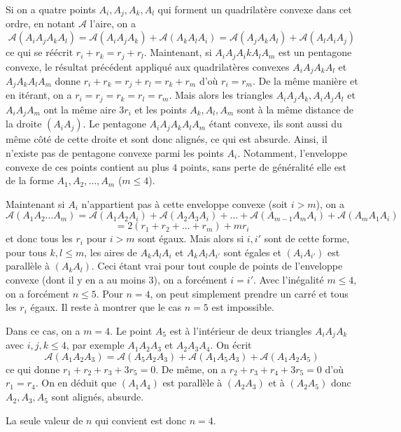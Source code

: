 \begin{sol}
Si on a quatre points $A_i,A_j,A_k,A_l$ qui forment un quadrilatère convexe dans cet ordre, en notant $\mathcal{A}$ l'aire, on a
$$\mathcal{A}(A_iA_jA_kA_l) = \mathcal{A}(A_iA_jA_k) + \mathcal{A}(A_kA_lA_i) = \mathcal{A}(A_jA_kA_l)+\mathcal{A}(A_lA_iA_j)$$
ce qui se réécrit $r_i+r_k = r_j+r_l$. Maintenant, si $A_iA_jA_ikA_lA_m$ est un pentagone convexe, le résultat précédent appliqué aux quadrilatères convexes $A_iA_jA_kA_l$ et $A_jA_kA_lA_m$ donne $r_i+r_k=r_j+r_l=r_k+r_m$ d'où $r_i=r_m$. De la même manière et en itérant, on a $r_i=r_j=r_k=r_l=r_m$. Mais alors les triangles $A_iA_jA_k,A_iA_jA_l$ et $A_iA_jA_m$ ont la même aire $3r_i$ et les points $A_k,A_l,A_m$ sont à la même distance de la droite $(A_iA_j)$. Le pentagone $A_iA_jA_kA_lA_m$ étant convexe, ils sont aussi du même côté de cette droite et sont donc alignés, ce qui est absurde. Ainsi, il n'existe pas de pentagone convexe parmi les points $A_i$. Notamment, l'enveloppe convexe de ces points contient au plus $4$ points, sans perte de généralité elle est de la forme $A_1,A_2,\ldots,A_m$ ($m\le 4$).

Maintenant si $A_i$ n'appartient pas à cette enveloppe convexe (soit $i>m$), on a
$$\mathcal{A}(A_1A_2\ldots A_m)= \mathcal{A}(A_1A_2A_i)+\mathcal{A}(A_2A_3A_i)+\ldots + \mathcal{A}(A_{m-1}A_mA_i)+\mathcal{A}(A_mA_1A_i)$$
$$=2(r_1+r_2+\ldots+r_m)+mr_i$$
et donc tous les $r_i$ pour $i>m$ sont égaux. Mais alors si $i,i'$ sont de cette forme, pour tous $k,l\le m$, les aires de $A_kA_lA_i$ et $A_kA_lA_{i'}$ sont égales et $(A_iA_{i'})$ est parallèle à $(A_kA_l)$. Ceci étant vrai pour tout couple de points de l'enveloppe convexe (dont il y en a au moins $3$), on a forcément $i=i'$. Avec l'inégalité $m\le 4$, on a forcément $n\le 5$. Pour $n=4$, on peut simplement prendre un carré et tous les $r_i$ égaux. Il reste à montrer que le cas $n=5$ est impossible.

Dans ce cas, on a $m=4$. Le point $A_5$ est à l'intérieur de deux triangles $A_iA_jA_k$ avec $i,j,k\le 4$, par exemple $A_1A_2A_3$ et $A_2A_3A_4$. On écrit
$$\mathcal{A}(A_1A_2A_3) = \mathcal{A}(A_5A_2A_3)+\mathcal{A}(A_1A_5A_3)+\mathcal{A}(A_1A_2A_5)$$
ce qui donne $r_1+r_2+r_3+3r_5=0$. De même, on a $r_2+r_3+r_4+3r_5=0$ d'où $r_1=r_4$. On en déduit que $(A_1A_4)$ est parallèle à $(A_2A_3)$ et à $(A_2A_5)$ donc $A_2,A_3,A_5$ sont alignés, absurde.

La seule valeur de $n$ qui convient est donc $n=4$.
\end{sol}

